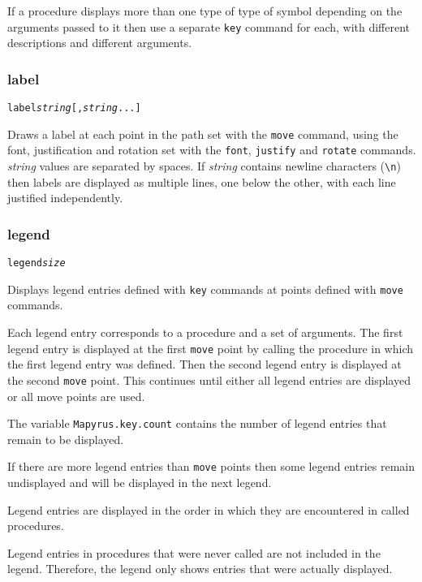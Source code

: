 If a procedure displays more than one type of type of symbol depending
on the arguments passed to it then use a separate
\texttt{key} command for each, with different descriptions
and different arguments.

\subsubsection{label}

\begin{alltt}
label \textit{string} [, \textit{string} ...]
\end{alltt}

Draws a label at each point in the path set with the \texttt{move} command,
using the font, justification and rotation set with the \texttt{font},
\texttt{justify} and \texttt{rotate} commands.  \textit{string} values are
separated by spaces.  If \textit{string} contains newline characters
(\texttt{\textbackslash{}n}) then labels are displayed as multiple lines, one
below the other, with each line justified independently.

\subsubsection{legend}

\begin{alltt}
legend \textit{size}
\end{alltt}

Displays legend entries defined with
\texttt{key} commands at points defined with
\texttt{move} commands.

Each legend entry corresponds to a procedure and a set of arguments.  The first
legend entry is displayed at the first \texttt{move} point by calling the
procedure in which the first legend entry was defined.  Then the second legend
entry is displayed at the second \texttt{move} point.  This continues until
either all legend entries are displayed or all move points are used.

The variable
\texttt{Mapyrus.key.count}
contains the number of legend entries that remain to be displayed.

If there are more legend entries than 
\texttt{move} points then some legend entries
remain undisplayed and will be displayed in the next legend.

Legend entries are displayed in the order in which they
are encountered in called procedures.

Legend entries in procedures that were never called are
not included in the legend.  Therefore, the legend only shows
entries that were actually displayed.

